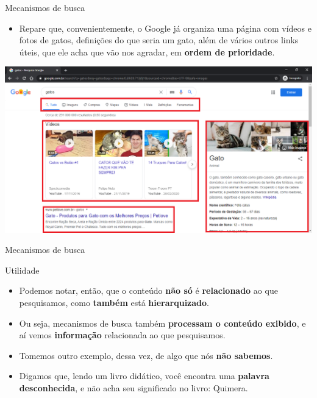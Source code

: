 \begin{frame}{Mecanismos de busca}
	\begin{block}{}
		\begin{itemize}
			\item Repare que, convenientemente, o Google já organiza uma página com vídeos e fotos de gatos, definições do que seria um gato, além de vários outros links úteis, que ele acha que vão nos agradar, em \textbf{ordem de prioridade}.
		\end{itemize}
	\end{block}

	\centering
	\includegraphics[width=0.75\linewidth]{Figuras/Ch03/fig2}
\end{frame}


\begin{frame}{Mecanismos de busca}
	\begin{block}{Utilidade}
		\begin{itemize}
			\item Podemos notar, então, que o conteúdo \textbf{não só} é \textbf{relacionado} ao que pesquisamos, como \textbf{também} está \textbf{hierarquizado}.
			\item Ou seja, mecanismos de busca também \textbf{processam o conteúdo exibido}, e aí vemos \textbf{informação} relacionada ao que pesquisamos.
			\item Tomemos outro exemplo, dessa vez, de algo que nós \textbf{não sabemos}.
			\item Digamos que, lendo um livro didático, você encontra uma \textbf{palavra desconhecida}, e não acha seu significado no livro: Quimera.
		\end{itemize}
	\end{block}

\end{frame}


